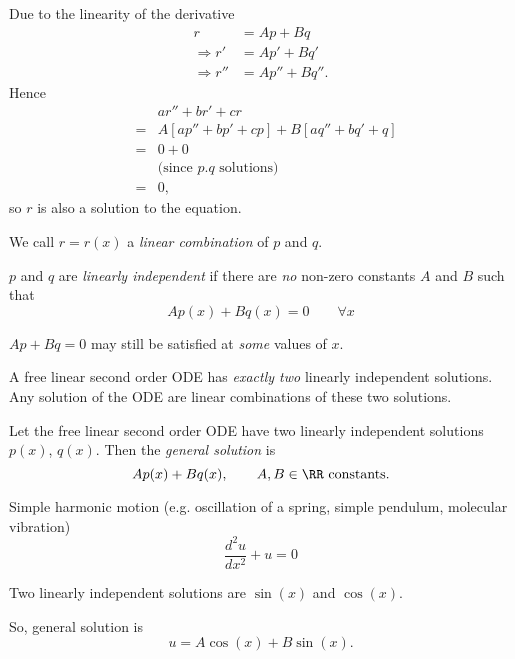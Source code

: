 \begin{Proof}
 Due to the linearity of the derivative
 \begin{align*}
  r & = Ap + Bq  \\
  \Rightarrow r' & = Ap' + Bq'  \\
  \Rightarrow r'' & = Ap'' + Bq''.
 \end{align*}
 Hence
 \begin{eqnarray*}
  && ar'' + br' + cr\\
  &=& A [ap'' + bp' + cp] + B [aq'' + bq' + q]\\
  &=& 0+0 \\
  && \text{(since $p.q$ solutions)}\\
  &=& 0,
 \end{eqnarray*}
  so $r$ is also a solution to the equation.
\end{Proof}

\begin{definition}
We call
 $r=r(x)$  a \emph{linear combination} of $p$ and $q$.
\end{definition}
 \begin{definition}
 $p$ and $q$ are \emph{linearly independent} if there are \emph{no} non-zero constants $A$ and $B$ such that
 \[
  Ap(x) + Bq(x) = 0 \qquad \forall x
 \]
\end{definition}

\begin{note}
 $Ap+Bq=0$ may still  be satisfied at \emph{some} values of $x$.
\end{note}

\begin{theorem}
 A free linear second order ODE has \emph{exactly two} linearly independent solutions.
 Any solution of the ODE are linear combinations of these two solutions.
\end{theorem}

\begin{definition}
Let the free linear second order ODE have two  linearly independent solutions $p(x)$, $q(x)$. 
Then the \emph{general solution} is
\[
 Ap(x) + Bq(x), \qquad \text{$A,B\in\RR$ constants.}
\]
\end{definition}

\begin{example}  Simple harmonic motion (e.g. oscillation of a spring, simple pendulum, molecular vibration)
 \[
  \dfrac{d^2u}{dx^2} + u = 0
 \]

Two linearly independent solutions are $\sin(x)$ and $\cos(x)$.%

So, general solution is
\[
 u = A \cos(x) + B \sin(x).
\]
\end{example}

